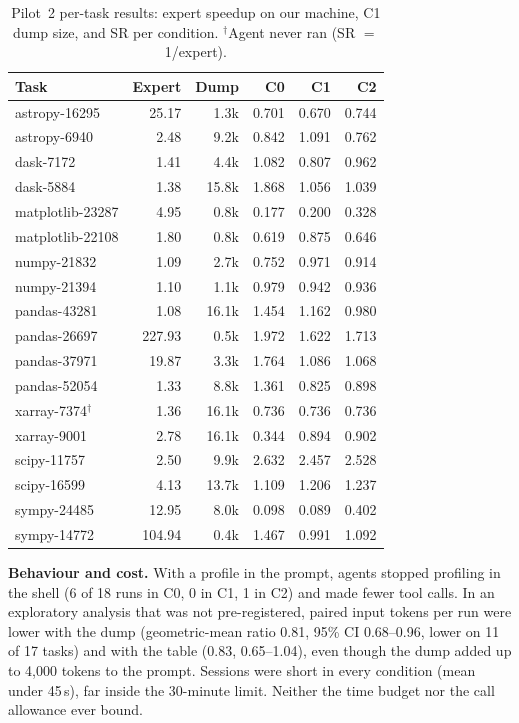 \documentclass[conference]{IEEEtran}
\begin{document}
\begin{table}[t]
\caption{Pilot~2 per-task results: expert speedup on our machine, C1 dump
size, and SR per condition. $^\dagger$Agent never ran (SR $=$ 1/expert).}
\label{tab:pertask}
\centering
\scriptsize
\setlength{\tabcolsep}{3pt}
\begin{tabular}{@{}lrrrrr@{}}
\toprule
Task & Expert & Dump & C0 & C1 & C2 \\
\midrule
astropy-16295 & 25.17 & 1.3k & 0.701 & 0.670 & 0.744 \\
astropy-6940 & 2.48 & 9.2k & 0.842 & 1.091 & 0.762 \\
dask-7172 & 1.41 & 4.4k & 1.082 & 0.807 & 0.962 \\
dask-5884 & 1.38 & 15.8k & 1.868 & 1.056 & 1.039 \\
matplotlib-23287 & 4.95 & 0.8k & 0.177 & 0.200 & 0.328 \\
matplotlib-22108 & 1.80 & 0.8k & 0.619 & 0.875 & 0.646 \\
numpy-21832 & 1.09 & 2.7k & 0.752 & 0.971 & 0.914 \\
numpy-21394 & 1.10 & 1.1k & 0.979 & 0.942 & 0.936 \\
pandas-43281 & 1.08 & 16.1k & 1.454 & 1.162 & 0.980 \\
pandas-26697 & 227.93 & 0.5k & 1.972 & 1.622 & 1.713 \\
pandas-37971 & 19.87 & 3.3k & 1.764 & 1.086 & 1.068 \\
pandas-52054 & 1.33 & 8.8k & 1.361 & 0.825 & 0.898 \\
xarray-7374$^\dagger$ & 1.36 & 16.1k & 0.736 & 0.736 & 0.736 \\
xarray-9001 & 2.78 & 16.1k & 0.344 & 0.894 & 0.902 \\
scipy-11757 & 2.50 & 9.9k & 2.632 & 2.457 & 2.528 \\
scipy-16599 & 4.13 & 13.7k & 1.109 & 1.206 & 1.237 \\
sympy-24485 & 12.95 & 8.0k & 0.098 & 0.089 & 0.402 \\
sympy-14772 & 104.94 & 0.4k & 1.467 & 0.991 & 1.092 \\
\bottomrule
\end{tabular}
\end{table}

\textbf{Behaviour and cost.} With a profile in the prompt, agents stopped
profiling in the shell (6 of 18 runs in C0, 0 in C1, 1 in C2) and made fewer
tool calls. In an exploratory analysis that was not pre-registered, paired
input tokens per run were lower with the dump (geometric-mean ratio 0.81, 95\%
CI 0.68--0.96, lower on 11 of 17 tasks) and with the table (0.83,
0.65--1.04), even though the dump added up to 4{,}000 tokens to the prompt.
Sessions were short in every condition (mean under 45\,s), far inside the
30-minute limit. Neither the time budget nor the call allowance ever bound.
\end{document}
